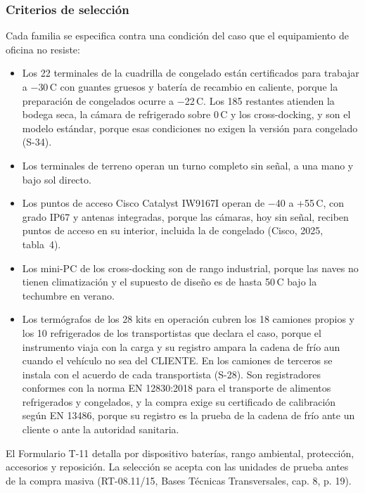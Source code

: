 \subsubsection{Criterios de selección}

Cada familia se especifica contra una condición del caso que el equipamiento de oficina no resiste:

\begin{itemize}
  \item Los 22 terminales de la cuadrilla de congelado están certificados para trabajar a $-$30\,\textdegree{}C con guantes gruesos y batería de recambio en caliente, porque la preparación de congelados ocurre a $-$22\,\textdegree{}C. Los 185 restantes atienden la bodega seca, la cámara de refrigerado sobre 0\,\textdegree{}C y los cross-docking, y son el modelo estándar, porque esas condiciones no exigen la versión para congelado (S-34).
  \item Los terminales de terreno operan un turno completo sin señal, a una mano y bajo sol directo.
  \item Los puntos de acceso Cisco Catalyst IW9167I operan de $-$40 a +55\,\textdegree{}C, con grado IP67 y antenas integradas, porque las cámaras, hoy sin señal, reciben puntos de acceso en su interior, incluida la de congelado (Cisco, 2025, tabla~4).
  \item Los mini-PC de los cross-docking son de rango industrial, porque las naves no tienen climatización y el supuesto de diseño es de hasta 50\,\textdegree{}C bajo la techumbre en verano.
  \item Los termógrafos de los 28 kits en operación cubren los 18 camiones propios y los 10 refrigerados de los transportistas que declara el caso, porque el instrumento viaja con la carga y su registro ampara la cadena de frío aun cuando el vehículo no sea del CLIENTE. En los camiones de terceros se instala con el acuerdo de cada transportista (S-28). Son registradores conformes con la norma EN 12830:2018 para el transporte de alimentos refrigerados y congelados, y la compra exige su certificado de calibración según EN 13486, porque su registro es la prueba de la cadena de frío ante un cliente o ante la autoridad sanitaria.
\end{itemize}

El Formulario T-11 detalla por dispositivo baterías, rango ambiental, protección, accesorios y reposición. La selección se acepta con las unidades de prueba antes de la compra masiva (RT-08.11/15, Bases Técnicas Transversales, cap. 8, p. 19).

